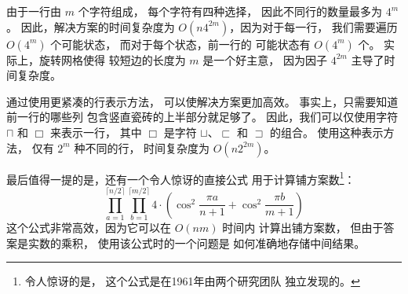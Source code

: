 由于一行由 $m$ 个字符组成，
每个字符有四种选择，
因此不同行的数量最多为 $4^m$。
因此，解决方案的时间复杂度为
$O(n 4^{2m})$，因为对于每一行，
我们需要遍历 $O(4^m)$ 个可能状态，
而对于每个状态，前一行的
可能状态有 $O(4^m)$ 个。
实际上，旋转网格使得
较短边的长度为 $m$ 是一个好主意，
因为因子 $4^{2m}$ 主导了时间复杂度。

通过使用更紧凑的行表示方法，
可以使解决方案更加高效。
事实上，只需要知道前一行的哪些列
包含竖直瓷砖的上半部分就足够了。
因此，我们可以仅使用字符
$\sqcap$ 和 $\Box$ 来表示一行，
其中 $\Box$ 是字符
$\sqcup$、$\sqsubset$ 和 $\sqsupset$ 的组合。
使用这种表示方法，
仅有 $2^m$ 种不同的行，
时间复杂度为 $O(n 2^{2m})$。

最后值得一提的是，还有一个令人惊讶的直接公式
用于计算铺方案数\footnote{令人惊讶的是，
这个公式是在1961年由两个研究团队 \cite{kas61,tem61}
独立发现的。}：
\[ \prod_{a=1}^{\lceil n/2 \rceil} \prod_{b=1}^{\lceil m/2 \rceil} 4 \cdot (\cos^2 \frac{\pi a}{n + 1} + \cos^2 \frac{\pi b}{m+1})\]
这个公式非常高效，因为它可以在 $O(nm)$ 时间内
计算出铺方案数，
但由于答案是实数的乘积，
使用该公式时的一个问题是
如何准确地存储中间结果。


